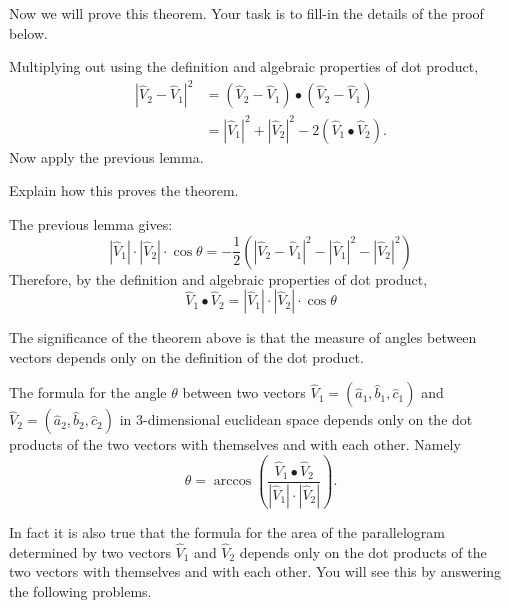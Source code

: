 \documentclass{ximera}
\begin{document}
Now we will prove this theorem. Your task is to fill-in the details of
the proof below.


\begin{problem}
Multiplying out using the definition and algebraic properties of dot product,%
\begin{align*}
\left\vert \hat{V}_{2}-\hat{V}_{1}\right\vert ^{2}  &  =\left(  \hat{V}%
_{2}-\hat{V}_{1}\right)  \bullet\left(  \hat{V}_{2}-\hat{V}_{1}\right) \\
&  =\left\vert \hat{V}_{1}\right\vert ^{2}+\left\vert \hat{V}_{2}\right\vert
^{2}-2\left(  \hat{V}_{1}\bullet\hat{V}_{2}\right)  .
\end{align*}
Now apply the previous lemma.

Explain how this proves the theorem.
\begin{freeResponse}
The previous lemma gives:
\[
|\hat{V}_{1}|\cdot|\hat{V}_{2}|\cdot\cos\theta = -\frac{1}{2}\left(|\hat{V}_{2}-\hat{V}_{1}|^2 -|\hat{V}_{1}|^2 - |\hat{V}_{2}|^2\right)
\]
Therefore, by the definition and algebraic properties of dot product,
\[
\hat{V}_{1}\bullet\hat{V}_{2} = |\hat{V}_{1}|\cdot|\hat{V}_{2}|\cdot\cos\theta
\]
\end{freeResponse} 
\end{problem}

The significance of the theorem above is that the measure of angles between
vectors depends only on the definition of the dot product.

\begin{corollary}
The formula for the angle $\theta$ between two vectors $\hat{V}_{1}=\left(
\hat{a}_{1},\hat{b}_{1},\hat{c}_{1}\right)  $ and $\hat{V}_{2}=\left(  \hat
{a}_{2},\hat{b}_{2},\hat{c}_{2}\right)  $ in $3$-dimensional euclidean space
depends only on the dot products of the two vectors with themselves and with
each other. Namely%
\[
\theta=\arccos\left(  \frac{\hat{V}_{1}\bullet\hat{V}_{2}%
}{\left\vert \hat{V}_{1}\right\vert \cdot\left\vert \hat{V}_{2}\right\vert
}\right)  .
\]

\end{corollary}

In fact it is also true that the formula for the area of the parallelogram
determined by two vectors $\hat{V}_{1}$ and $\hat{V}_{2}$ depends only on the
dot products of the two vectors with themselves and with each other. You will
see this by answering the following problems.
\end{document}
